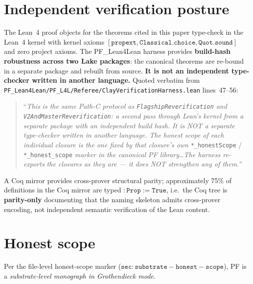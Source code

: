 \documentclass[11pt,a4paper]{article}
\theoremstyle{plain}
\theoremstyle{definition}
\begin{document}
\section{Independent verification posture}
\label{sec:lean}

The Lean~4 proof objects for the theorems cited in this paper
type-check in the Lean~4 kernel with kernel axioms
$\mathtt{[propext, Classical.choice, Quot.sound]}$ and zero project
axioms. The PF\_Lean4Lean harness provides \textbf{build-hash
robustness across two Lake packages}: the canonical theorems are
re-bound in a separate package and rebuilt from source. \textbf{It is
not an independent type-checker written in another language.} Quoted
verbatim from
\texttt{PF\_Lean4Lean/PF\_L4L/Referee/ClayVerificationHarness.lean}
lines~47--56:
\begin{quote}
``\emph{This is the same Path-C protocol as
\texttt{FlagshipReverification} and
\texttt{V2AndMasterReverification}: a second pass through Lean's
kernel from a separate package with an independent build hash. It is
NOT a separate type-checker written in another language. The honest
scope of each individual closure is the one fixed by that closure's
own} \texttt{*\_honestScope} / \texttt{*\_honest\_scope}
\emph{marker in the canonical PF library\ldots The harness re-exports
the closures as they are --- it does NOT strengthen any of them.}''
\end{quote}

A Coq mirror provides cross-prover structural parity; approximately
75\% of definitions in the Coq mirror are typed
$\mathtt{: Prop := True}$, i.e.\ the Coq tree is \textbf{parity-only}
documenting that the naming skeleton admits cross-prover encoding,
not independent semantic verification of the Lean content.

\section{Honest scope}
\label{sec:honest-scope}

Per the file-level honest-scope marker
($\mathtt{sec:substrate-honest-scope}$), PF is a
\emph{substrate-level monograph in Grothendieck mode}.
\end{document}
